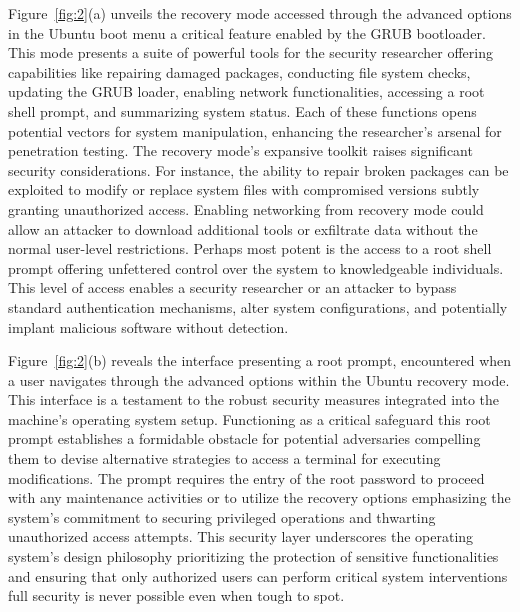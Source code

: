 \documentclass[manuscript,acmsmall,anonymous,review,screen,nonacm=true, authorversion=true]{acmart}
\begin{document}
Figure~\ref{fig:2}(a) unveils the recovery mode accessed through the advanced options in the Ubuntu
boot menu a critical feature enabled by the GRUB bootloader. This mode presents a suite of
powerful tools for the security researcher offering capabilities like repairing damaged packages,
conducting file system checks, updating the GRUB loader, enabling network functionalities,
accessing a root shell prompt, and summarizing system status. Each of these functions opens
potential vectors for system manipulation, enhancing the researcher's arsenal for penetration testing. The recovery mode's expansive toolkit raises significant security considerations. For instance, the ability to repair broken packages can be exploited to modify or replace
system files with compromised versions subtly granting unauthorized access. Enabling
networking from recovery mode could allow an attacker to download additional tools or
exfiltrate data without the normal user-level restrictions. Perhaps most potent is the access
to a root shell prompt offering unfettered control over the system to knowledgeable
individuals. This level of access enables a security researcher or an attacker to bypass
standard authentication mechanisms, alter system configurations, and potentially implant
malicious software without detection.

Figure~\ref{fig:2}(b) reveals the interface presenting a root prompt, encountered when a user
navigates through the advanced options within the Ubuntu recovery mode. This interface is
a testament to the robust security measures integrated into the machine's operating system setup.
Functioning as a critical safeguard this root prompt establishes a formidable obstacle for
potential adversaries compelling them to devise alternative strategies to access a terminal for
executing modifications. The prompt requires the entry of the root password to proceed
with any maintenance activities or to utilize the recovery options emphasizing the system's
commitment to securing privileged operations and thwarting unauthorized access attempts.
This security layer underscores the operating system's design philosophy prioritizing the
protection of sensitive functionalities and ensuring that only authorized users can perform critical
system interventions full security is never possible even when tough to spot.
\end{document}
